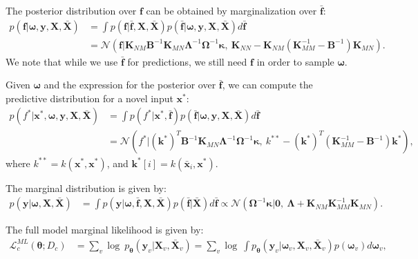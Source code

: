 \documentclass{article}
\newcommand{\normal}{\mathcal{N}}
\newcommand{\bld}[1]{\boldsymbol{#1}}
\def\rvf{{\mathbf{f}}}
\def\rvk{{\mathbf{k}}}
\def\rvx{{\mathbf{x}}}
\def\rvy{{\mathbf{y}}}
\def\rmX{{\mathbf{X}}}
\newcommand{\Knn}{\mathbf{K}_{NN}}
\newcommand{\Kmn}{\mathbf{K}_{MN}}
\newcommand{\Knm}{\mathbf{K}_{NM}}
\newcommand{\KmmInv}{\mathbf{K}_{MM}^{-1}}
\newcommand{\rvfbar}{\bar{\bld{\mathbf{f}}}}
\newcommand{\rvomega}{\bld{\mathbf{\omega}}}
\newcommand{\rvkappa}{\bld{\mathbf{\kappa}}}
\newcommand{\rmOmegaInv}{\mathbf{\Omega}^{-1}}
\newcommand{\rmLambda}{\mathbf{\Lambda}}
\newcommand{\rmLambdaInv}{\mathbf{\Lambda}^{-1}}
\newcommand{\NNP}{\mathbf{\theta}}
\newcommand{\rmXbar}{\bar{\mathbf{\mathbf{X}}}}
\newcommand{\rvxbar}{\bar{\mathbf{\mathbf{x}}}}
\newcommand{\rmQInv}{\mathbf{B}^{-1}}
\begin{document}
The posterior distribution over $\rvf$ can be obtained by marginalization over $\rvfbar$:
\begin{equation} \label{eq:ip2_posterior_f_appendix}
    \begin{aligned}
    p(\rvf | \rvomega, \rvy, \rmX, \rmXbar) &= \int p(\rvf | \rvfbar, \rmX, \rmXbar)p(\rvfbar | \rvomega, \rvy, \rmX, \rmXbar) d\rvfbar  \\
    &= \normal(\rvf | \Knm\rmQInv\Kmn\rmLambdaInv\rmOmegaInv\rvkappa,~\Knn - \Knm(\KmmInv - \rmQInv)\Kmn).
    \end{aligned}
\end{equation}
We note that while we use $\rvfbar$ for predictions, we still need $\rvf$ in order to sample $\rvomega$.

Given $\rvomega$ and the expression for the posterior over $\rvfbar$, we can compute the predictive distribution for a novel input $\rvx^*$:
\begin{equation} \label{eq:ip2_posterior_pred_f_appendix}
    \begin{aligned}
    p(f^* | \rvx^*, \rvomega, \rvy, \rmX, \rmXbar) &= \int p(f^* | \rvx^*, \rvfbar)p(\rvfbar | \rvomega, \rvy, \rmX, \rmXbar) d\rvfbar  \\
    &= \normal(f^* | (\rvk^*)^T\rmQInv\Kmn\rmLambdaInv\rmOmegaInv\rvkappa,~k^{**} - (\rvk^{*})^T(\KmmInv - \rmQInv)\rvk^{*}),
    \end{aligned}
\end{equation}
where $k^{**} = k(\rvx^*, \rvx^*)$, and $\rvk^*[i]=k(\rvxbar_i, \rvx^*)$.

The marginal distribution is given by:
\begin{equation} \label{eq:ip2_marginal_appendix}
    \begin{aligned}
    p(\rvy | \rvomega, \rmX, \rmXbar) &= \int p(\rvy | \rvomega, \rvfbar, \rmX, \rmXbar)p(\rvfbar | \rmXbar) d\rvfbar \propto \normal(\rmOmegaInv\rvkappa | \bld{0},~\rmLambda + \Knm\KmmInv\Kmn).
    \end{aligned}
\end{equation}

The full model marginal likelihood is given by:
\begin{equation}\label{eq:tree_objective_ml_appendix}
    \begin{aligned}
        \mathcal{L}^{ML}_c (\NNP ; D_c) &= \sum_{v} \log~p_{\NNP}(\rvy_{v} | \rmX_{v}, \rmXbar_{v}) = \sum_{v} \log~\int p_{\NNP}(\rvy_{v} | \rvomega_{v}, \rmX_{v}, \rmXbar_{v}) p(\rvomega_{v}) d\rvomega_{v},
    \end{aligned}
\end{equation}
\end{document}
